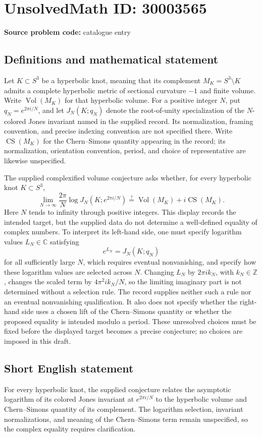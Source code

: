 \documentclass[11pt]{article}
\newcommand{\Z}{\mathbb{Z}}
\newcommand{\C}{\mathbb{C}}
\begin{document}
\section*{UnsolvedMath ID: 30003565}
\textbf{Source problem code:} catalogue entry
\subsection{Definitions and mathematical statement}
Let \(K\subset S^3\) be a hyperbolic knot, meaning that its complement \(M_K=S^3\setminus K\) admits a complete hyperbolic metric of sectional curvature \(-1\) and finite volume. Write \(\operatorname{Vol}(M_K)\) for that hyperbolic volume. For a positive integer \(N\), put \(q_N=e^{2\pi i/N}\), and let \(J_N(K;q_N)\) denote the root-of-unity specialization of the \(N\)-colored Jones invariant named in the supplied record. Its normalization, framing convention, and precise indexing convention are not specified there. Write \(\operatorname{CS}(M_K)\) for the Chern--Simons quantity appearing in the record; its normalization, orientation convention, period, and choice of representative are likewise unspecified.

The supplied complexified volume conjecture asks whether, for every hyperbolic knot \(K\subset S^3\),
\[
\lim_{N\to\infty}\frac{2\pi}{N}\log J_N\!\left(K;e^{2\pi i/N}\right)
\stackrel{?}{=}
\operatorname{Vol}(M_K)+i\operatorname{CS}(M_K).
\]
Here \(N\) tends to infinity through positive integers. This display records the intended target, but the supplied data do not determine a well-defined equality of complex numbers. To interpret its left-hand side, one must specify logarithm values \(L_N\in\C\) satisfying
\[
 e^{L_N}=J_N(K;q_N)
\]
for all sufficiently large \(N\), which requires eventual nonvanishing, and specify how these logarithm values are selected across \(N\). Changing \(L_N\) by \(2\pi i k_N\), with \(k_N\in\Z\), changes the scaled term by \(4\pi^2 i k_N/N\), so the limiting imaginary part is not determined without a selection rule. The record supplies neither such a rule nor an eventual nonvanishing qualification. It also does not specify whether the right-hand side uses a chosen lift of the Chern--Simons quantity or whether the proposed equality is intended modulo a period. These unresolved choices must be fixed before the displayed target becomes a precise conjecture; no choices are imposed in this draft.
\subsection{Short English statement}
For every hyperbolic knot, the supplied conjecture relates the asymptotic logarithm of its colored Jones invariant at \(e^{2\pi i/N}\) to the hyperbolic volume and Chern--Simons quantity of its complement. The logarithm selection, invariant normalizations, and meaning of the Chern--Simons term remain unspecified, so the complex equality requires clarification.
\end{document}
